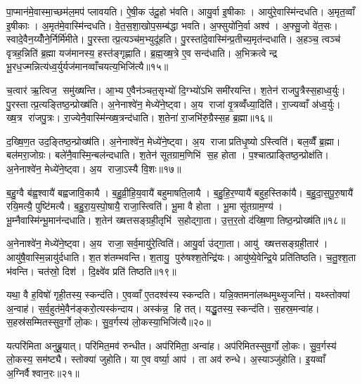 पा॒प्मान॑मे॒वास्मा॒च्छम॑ल॒मप॑ प्लावयति। ऐ॒षी॒क उ॑दू॒हो भ॑वति। आयु॒र्वा इ॒षीकाः। आयु॑रे॒वास्मि॑न्दधति। अ॒मृत॒व्वाँ इ॒षीकाः। अ॒मृत॑मे॒वास्मि॑न्दधति। वे॒त॒स॒शा॒खोप॒सम्ब॑द्धा भवति। अ॒फ्सुयो॑नि॒र्वा अश्व॑। अ॒फ्सु॒जो वे॑त॒सः। स्वादे॒वैन॒य्योँने॒र्निर्मि॑मीते। पु॒रस्तात्प्र॒त्यञ्च॑म॒भ्युदू॑हति। पु॒रस्ता॑दे॒वास्मि॑न्प्र॒तीच्य॒मृत॑न्दधाति। अ॒हञ्च॒ त्वञ्च॑ वृत्रह॒न्निति॑ ब्र॒ह्मा यज॑मानस्य॒ हस्त॑ङ्गृह्णाति। ब्र॒ह्म॒ख्ष॒त्रे ए॒व सन्द॑धाति। अ॒भिक्रत्वेन्द्र भू॒रध॒ज्मन्नित्य॑ध्व॒र्युर्यज॑मानव्वाँचयत्य॒भिजि॑त्यै॥१५॥\anuvakamend[भ॒व॒ति॒ प्ला॒व॒य॒ति॒ मि॒मी॒ते॒ पञ्च॑ च]

च॒त्वार॑ ऋ॒त्विज॒ समु॑ख्षन्ति। आ॒भ्य ए॒वैन॑ञ्चत॒सृभ्यो॑ दि॒ग्भ्यो॑ऽभि समी॑रयन्ति। श॒तेन॑ राजपु॒त्रैस्स॒हाध्व॒र्युः। पु॒रस्तात्प्र॒त्यङ्तिष्ठ॒न्प्रोख्ष॑ति। अ॒नेनाश्वे॑न॒ मेध्ये॑ने॒ष्ट्वा। अ॒य राजा॑ वृ॒त्रव्वँ॑ध्या॒दिति॑। रा॒ज्यव्वाँ अ॑ध्व॒र्युः। ख्ष॒त्र रा॑जपु॒त्रः। रा॒ज्येनै॒वास्मि॑न्ख्ष॒त्रन्द॑धाति। श॒तेना॑ रा॒जभि॑रु॒ग्रैस्स॒ह ब्र॒ह्मा॥१६॥

द॒ख्षि॒ण॒त उद॒ङ्तिष्ठ॒न्प्रोख्ष॑ति। अ॒नेनाश्वे॑न॒ मेध्ये॑ने॒ष्ट्वा। अ॒य राजाप्रतिधृ॒ष्योऽस्त्विति॑। बल॒व्वैँ ब्र॒ह्मा। बल॑मरा॒जोग्रः। बले॑नै॒वास्मि॒न्बल॑न्दधाति। श॒तेन॑ सूतग्राम॒णिभि॑ स॒ह होता। प॒श्चात्प्राङ्तिष्ठ॒न्प्रोक्ष॑ति। अ॒नेनाश्वे॑न॒ मेध्ये॑ने॒ष्ट्वा। अ॒य राजा॒ऽस्यै वि॒शः॥१७॥

ब॒हु॒ग्वै ब॑ह्व॒श्वायै॑ बह्वजावि॒कायै। ब॒हु॒व्री॒हि॒य॒वायै॑ बहुमाषति॒लायै। ब॒हु॒हि॒र॒ण्यायै॑ बहुह॒स्तिका॑यै। ब॒हु॒दा॒स॒पू॒रु॒षायै॑ रयि॒मत्यै॒ पुष्टि॑मत्यै। ब॒हु॒रा॒य॒स्पो॒षायै॒ राजा॒स्त्विति॑। भू॒मा वै होता। भू॒मा सू॑तग्राम॒ण्य॑। भू॒म्नैवास्मि॑न्भू॒मान॑न्दधाति। श॒तेन॑ ख्षत्तसङ्ग्रही॒तृभि॑ स॒होद्गा॒ता। उ॒त्त॒र॒तो द॑ख्षि॒णा तिष्ठ॒न्प्रोख्ष॑ति॥१८॥

अ॒नेनाश्वे॑न॒ मेध्ये॑ने॒ष्ट्वा। अ॒य राजा॒ सर्व॒मायु॑रे॒त्विति॑। आयु॒र्वा उ॑द्गा॒ता। आयु॑ ख्षत्तसङ्ग्रही॒तार॑। आयु॑षै॒वास्मि॒न्नायु॑र्दधाति। श॒तश॑तम्भवन्ति। श॒तायु॒ पुरु॑षश्श॒तेन्द्रि॑यः। आयु॑ष्ये॒वेन्द्रि॒ये प्रति॑तिष्ठति। च॒तु॒श्श॒ता भ॑वन्ति। चत॑स्रो॒ दिश॑। दि॒क्ष्वे॑व प्रति॑ तिष्ठति॥१९॥\anuvakamend[ब्र॒ह्मा वि॒श उ॑ख्षति॒ दिश॒ एक॑ञ्च]

यथा॒ वै ह॒विषो॑ गृही॒तस्य॒ स्कन्द॑ति। ए॒वव्वाँ ए॒तदश्व॑स्य स्कन्दति। यन्नि॒क्तमना॑लब्धमुथ्सृ॒जन्ति॑। यथ्स्तोक्या॑ अ॒न्वाह॑। स॒र्व॒हुत॑मे॒वैन॑ङ्करो॒त्यस्क॑न्दाय। अस्क॑न्न॒ हि तत्। यद्धु॒तस्य॒ स्कन्द॑ति। स॒हस्र॒मन्वा॑ह। स॒हस्र॑सम्मितस्सुव॒र्गो लो॒कः। सु॒व॒र्गस्य॑ लो॒कस्या॒भिजि॑त्यै॥२०॥

यत्परि॑मिता अनुब्रू॒यात्। परि॑मित॒मव॑ रुन्धीत। अप॑रिमिता॒ अन्वा॑ह। अप॑रिमितस्सुव॒र्गो लो॒कः। सु॒व॒र्गस्य॑ लो॒कस्य॒ सम॑ष्ट्यै। स्तोक्या॑ जुहोति। या ए॒व वर्ष्या॒ आप॑। ता अव॑ रुन्धे। अ॒स्याञ्जु॑होति। इ॒यव्वाँ अ॒ग्निर्वैश्वान॒रः॥२१॥

